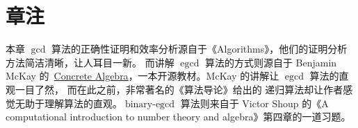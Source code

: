 \section*{章注}

本章 $\gcd$ 算法的正确性证明和效率分析源自于《Algorithms》\cite{DPV08algorithms}，他们的证明分析方法简洁清晰，让人耳目一新。
而讲解 $\operatorname{egcd}$ 算法的方式则源自于 Benjamin McKay 的~\href{https://github.com/Ben-McKay/concrete-algebra}{Concrete Algebra}，一本开源教材。McKay 的讲解让 $\operatorname{egcd}$ 算法的直观一目了然，
而在此之前，非常著名的《算法导论》\cite{CLRS22}给出的
递归算法却让作者感觉无助于理解算法的直观。$\operatorname{binary-egcd}$ 算法则来自于 Victor Shoup 的《A computational introduction to number theory and algebra》\cite{Sho09nta}第四章的一道习题。

